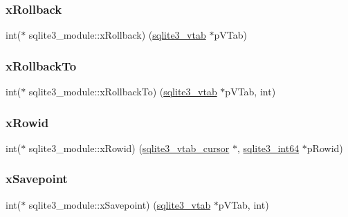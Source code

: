 \mbox{\label{structsqlite3__module_a2168ba5102151712f8bbfdc5b2ccaf9c}} 
\subsubsection{\texorpdfstring{xRollback}{xRollback}}
{\footnotesize\ttfamily int($\ast$ sqlite3\+\_\+module\+::x\+Rollback) (\mbox{\hyperlink{structsqlite3__vtab}{sqlite3\+\_\+vtab}} $\ast$p\+V\+Tab)}

\mbox{\label{structsqlite3__module_aaf96452ff3240596b8b8850c2baff3eb}} 
\subsubsection{\texorpdfstring{xRollbackTo}{xRollbackTo}}
{\footnotesize\ttfamily int($\ast$ sqlite3\+\_\+module\+::x\+Rollback\+To) (\mbox{\hyperlink{structsqlite3__vtab}{sqlite3\+\_\+vtab}} $\ast$p\+V\+Tab, int)}

\mbox{\label{structsqlite3__module_a26c91e3a8a34d356ff36790488e4acf1}} 
\subsubsection{\texorpdfstring{xRowid}{xRowid}}
{\footnotesize\ttfamily int($\ast$ sqlite3\+\_\+module\+::x\+Rowid) (\mbox{\hyperlink{structsqlite3__vtab__cursor}{sqlite3\+\_\+vtab\+\_\+cursor}} $\ast$, \mbox{\hyperlink{sqlite3_8h_a0a4d3e6c1ad46f90e746b920ab6ca0d2}{sqlite3\+\_\+int64}} $\ast$p\+Rowid)}

\mbox{\label{structsqlite3__module_a3819f1935503e558637647c359193ef9}} 
\subsubsection{\texorpdfstring{xSavepoint}{xSavepoint}}
{\footnotesize\ttfamily int($\ast$ sqlite3\+\_\+module\+::x\+Savepoint) (\mbox{\hyperlink{structsqlite3__vtab}{sqlite3\+\_\+vtab}} $\ast$p\+V\+Tab, int)}

